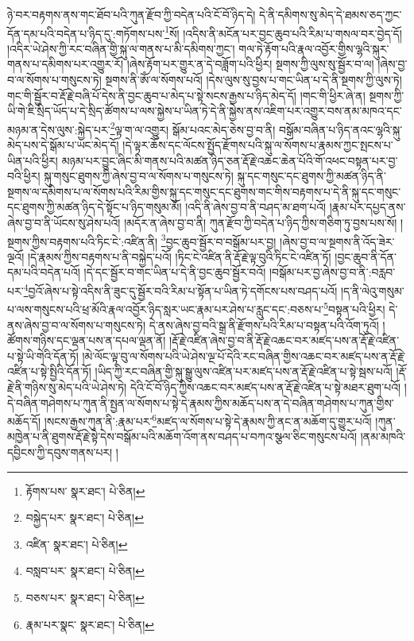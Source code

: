 ཉེ་བར་བརྟགས་ནས་གང་ཐོབ་པའི་ཀུན་རྫོབ་ཀྱི་བདེན་པའི་ངོ་བོ་ཉིད་དེ། དེ་ནི་དམིགས་སུ་མེད་དེ་ཐམས་ཅད་ཀྱང་དོན་དམ་པའི་བདེན་པ་ཉིད་དུ་:གཏོགས་པས་\footnote{རྟོགས་པས་  སྣར་ཐང་།  པེ་ཅིན། }སོ། །འདིས་ནི་མངོན་པར་བྱང་ཆུབ་པའི་རིམ་པ་གསལ་བར་བྱེད་དོ། །འདིར་ཡེ་ཤེས་ཀྱི་རང་བཞིན་གྱི་སྐུ་ལ་གནས་པ་མི་དམིགས་ཀྱང་། གལ་ཏེ་རྟོག་པའི་རྣལ་འབྱོར་གྱིས་ལྷའི་སྐུར་གནས་པ་དམིགས་པར་འགྱུར་རོ། །ཞེས་རྟོག་པར་གྱུར་ན་དེ་བཟློག་པའི་ཕྱིར། སྔགས་ཀྱི་ལུས་སུ་སྦྱོར་བ་ལ། །ཞེས་བྱ་བ་ལ་སོགས་པ་གསུངས་ཏེ། སྔགས་ནི་ཨོཾ་ལ་སོགས་པའོ། །དེས་ལུས་སུ་བྱས་པ་གང་ཡིན་པ་དེ་ནི་སྔགས་ཀྱི་ལུས་ཏེ། གང་གི་སྦྱོར་བ་རྡོ་རྗེ་བཞི་པོ་དེས་ནི་བྱང་ཆུབ་པ་མེད་པ་སྟེ་སངས་རྒྱས་པ་ཉིད་མེད་དོ། །གང་གི་ཕྱིར་ཞེ་ན། སྔགས་ཀྱི་ཡི་གེ་ཇི་སྲིད་ཡོད་པ་དེ་སྲིད་ཚོགས་པ་ལས་སྐྱེས་པ་ཡིན་ཏེ་དེ་ནི་སྐྱེས་ནས་འཇིག་པར་འགྱུར་བས་ནམ་མཁའ་དང་མཉམ་ན་དེས་ལུས་:སྐྱེད་པར་\footnote{བསྐྱེད་པར་  སྣར་ཐང་།  པེ་ཅིན། }ལྟ་ག་ལ་འགྱུར། སྒོམ་པའང་མེད་ཅེས་བྱ་བ་ནི། བསྒོམ་བཞིན་པ་ཉིད་ནའང་ལྷའི་སྐུ་མེད་པས་དེ་སྒོམ་པ་ཡང་མེད་དོ། །དེ་ལྟར་ཆོས་དང་ལོངས་སྤྱོད་རྫོགས་པའི་སྐུ་ལ་སོགས་པ་རྣམས་ཀྱང་སྤངས་པ་ཡིན་པའི་ཕྱིར། མཉམ་པར་བྱུང་ཞིང་མི་གནས་པའི་མཚན་ཉིད་ཅན་རྡོ་རྗེ་འཆང་ཆེན་པོའི་གོ་འཕང་བསྟན་པར་བྱ་བའི་ཕྱིར། སྐུ་གསུང་ཐུགས་ཀྱི་ཞེས་བྱ་བ་ལ་སོགས་པ་གསུངས་ཏེ། སྐུ་དང་གསུང་དང་ཐུགས་ཀྱི་མཚན་ཉིད་ནི་སྔགས་ལ་དམིགས་པ་ལ་སོགས་པའི་རིམ་གྱིས་སྐུ་དང་གསུང་དང་ཐུགས་གང་གིས་བརྟགས་པ་དེ་ནི་སྐུ་དང་གསུང་དང་ཐུགས་ཀྱི་མཚན་ཉིད་དེ་སྟོང་པ་ཉིད་གསུམ་མོ། །འདི་ནི་ཞེས་བྱ་བ་ནི་བཤད་མ་ཐག་པའོ། །རྣམ་པར་དཔྱད་ནས་ཞེས་བྱ་བ་ནི་ཡོངས་སུ་ཤེས་པའོ། །མདོར་ན་ཞེས་བྱ་བ་ནི། ཀུན་རྫོབ་ཀྱི་བདེན་པ་ཉིད་ཀྱིས་གཅིག་ཏུ་བྱས་པས་སོ། །སྔགས་ཀྱིས་བརྟགས་པའི་ཏིང་ངེ་:འཛིན་ནི། \footnote{འཛིན་  སྣར་ཐང་།  པེ་ཅིན། }བྱང་ཆུབ་སྦྱོར་བ་བསྒོམ་པར་བྱ། །ཞེས་བྱ་བ་ལ་སྔགས་ནི་འོད་ཟེར་ལྔའོ། །དེ་རྣམས་ཀྱིས་བརྟགས་པ་ནི་བསྐྱེད་པའོ། །ཏིང་ངེ་འཛིན་ནི་རྡོ་རྗེ་ལྟ་བུའི་ཏིང་ངེ་འཛིན་ཏོ། །བྱང་ཆུབ་ནི་དོན་དམ་པའི་བདེན་པའོ། །དེ་དང་སྦྱོར་བ་གང་ཡིན་པ་དེ་ནི་བྱང་ཆུབ་སྦྱོར་བའོ། །བསྒོམ་པར་བྱ་ཞེས་བྱ་བ་ནི་:བརླབ་པར་\footnote{བསླབ་པར་  སྣར་ཐང་།  པེ་ཅིན། }བྱའོ་ཞེས་པ་སྟེ་འདིས་ནི་ཟུང་དུ་སྦྱོར་བའི་རིམ་པ་སྟོན་པ་ཡིན་ཏེ་དགོངས་པས་བཤད་པའོ། །ད་ནི་ལེའུ་གསུམ་པ་ལས་གསུངས་པའི་ཕྲ་མོའི་རྣལ་འབྱོར་ཉིད་སླར་ཡང་རྣམ་པར་ཤེས་པ་རླུང་དང་:བཅས་པ་\footnote{བཅས་པར་  སྣར་ཐང་།  པེ་ཅིན། }བསྟན་པའི་ཕྱིར། དེ་ནས་ཞེས་བྱ་བ་ལ་སོགས་པ་གསུངས་ཏེ། དེ་ནས་ཞེས་བྱ་བའི་སྒྲ་ནི་རྫོགས་པའི་རིམ་པ་བསྟན་པའི་འོག་ཏུའོ། །ཚོགས་གཉིས་དང་ལྡན་པས་ན་དཔལ་ལྡན་ནོ། །རྡོ་རྗེ་འཛིན་ཞེས་བྱ་བ་ནི་རྡོ་རྗེ་འཆང་བར་མཛད་པས་ན་རྡོ་རྗེ་འཛིན་པ་སྟེ་ཡི་གེའི་དོན་ཏོ། །མེ་ལོང་ལྟ་བུ་ལ་སོགས་པའི་ཡེ་ཤེས་ལྔ་པོ་དེའི་རང་བཞིན་གྱིས་འཆང་བར་མཛད་པས་ན་རྡོ་རྗེ་འཛིན་པ་སྟེ་སྤྱིའི་དོན་ཏོ། །ཡིད་ཀྱི་རང་བཞིན་གྱི་སྐུ་སྒྱུ་ལུས་འཛིན་པར་མཛད་པས་ན་རྡོ་རྗེ་འཛིན་པ་སྟེ་སྦས་པའོ། །རྡོ་རྗེ་ནི་གཉིས་སུ་མེད་པའི་ཡེ་ཤེས་ཏེ། དེའི་ངོ་བོ་ཉིད་ཀྱིས་འཆང་བར་མཛད་པས་ན་རྡོ་རྗེ་འཛིན་པ་སྟེ་མཐར་ཐུག་པའོ། །དེ་བཞིན་གཤེགས་པ་ཀུན་ནི་སྤྱན་ལ་སོགས་པ་སྟེ་དེ་རྣམས་ཀྱིས་མཆོད་པས་ན་དེ་བཞིན་གཤེགས་པ་ཀུན་གྱིས་མཆོད་དོ། །སངས་རྒྱས་ཀུན་ནི་:རྣམ་པར་\footnote{རྣམ་པར་སྣང་  སྣར་ཐང་།  པེ་ཅིན། }མཛད་ལ་སོགས་པ་སྟེ་དེ་རྣམས་ཀྱི་ནང་ན་མཆོག་དུ་གྱུར་པའོ། །ཀུན་མཁྱེན་པ་ནི་ཐུགས་རྡོ་རྗེ་སྟེ་དེས་བསྒོམ་པའི་མཆོག་འོག་ནས་བཤད་པ་བཀའ་སྩལ་ཅིང་གསུངས་པའོ། །ནམ་མཁའི་དབྱིངས་ཀྱི་དབུས་གནས་པར། །
